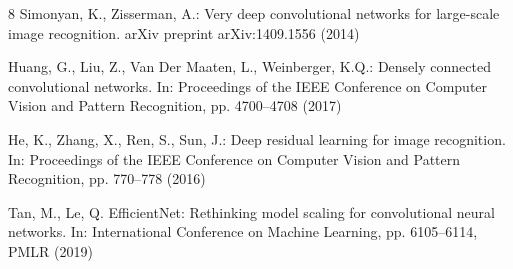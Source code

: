 \documentclass[runningheads]{llncs}
\begin{document}
\begin{thebibliography}{8}
Simonyan, K., Zisserman, A.: Very deep convolutional networks for large-scale image recognition. arXiv preprint arXiv:1409.1556 (2014)

Huang, G., Liu, Z., Van Der Maaten, L., Weinberger, K.Q.: Densely connected convolutional networks. In: Proceedings of the IEEE Conference on Computer Vision and Pattern Recognition, pp. 4700–4708 (2017)

He, K., Zhang, X., Ren, S., Sun, J.: Deep residual learning for image recognition. In: Proceedings of the IEEE Conference on Computer Vision and Pattern Recognition, pp. 770–778 (2016)

Tan, M., Le, Q. EfficientNet: Rethinking model scaling for convolutional neural networks. In: International Conference on Machine Learning, pp. 6105–6114, PMLR (2019)

\end{thebibliography}
\end{document}
